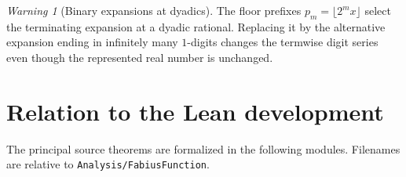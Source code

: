 \documentclass[11pt,oneside]{article}
\theoremstyle{definition}
\theoremstyle{remark}
\newtheorem{warning}[theorem]{Warning}
\newcommand{\repo}{\nolinkurl{Analysis/FabiusFunction}}
\begin{document}
\begin{warning}[Binary expansions at dyadics]
The floor prefixes $p_m=\lfloor2^mx\rfloor$ select the terminating expansion at a dyadic
rational.  Replacing it by the alternative expansion ending in infinitely many $1$-digits
changes the termwise digit series even though the represented real number is unchanged.
\end{warning}

\section{Relation to the Lean development}
\label{dyadicweb:sec:formal-map}

The principal source theorems are formalized in the following modules.  Filenames are relative
to \repo.
\end{document}
